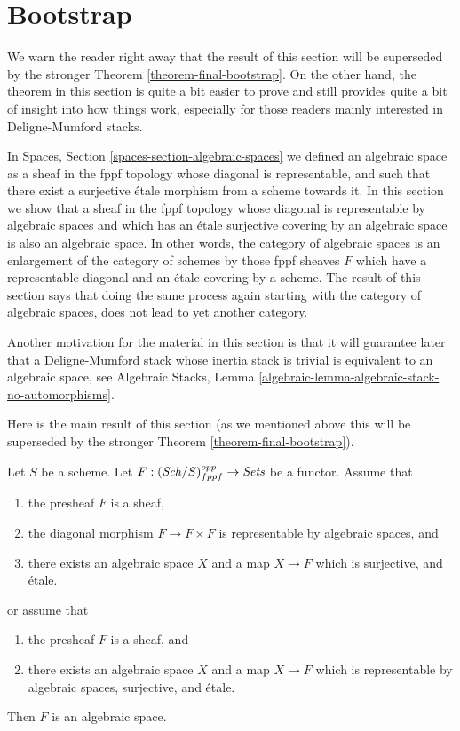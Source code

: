 \section{Bootstrap}
\label{section-bootstrap}

\noindent
We warn the reader right away that the result of this section will
be superseded by the stronger
Theorem \ref{theorem-final-bootstrap}.
On the other hand, the theorem in this section is quite a bit easier to
prove and still provides quite a bit of insight into how things work,
especially for those readers mainly interested in Deligne-Mumford
stacks.

\medskip\noindent
In
Spaces, Section \ref{spaces-section-algebraic-spaces}
we defined an algebraic space as a sheaf in the fppf topology whose
diagonal is representable, and such that there exist a surjective \'etale
morphism from a scheme towards it. In this section we show that
a sheaf in the fppf topology whose diagonal is representable by algebraic
spaces and which has an \'etale surjective covering by an algebraic space
is also an algebraic space.
In other words, the category of algebraic spaces is an enlargement of the
category of schemes by those fppf sheaves $F$ which have a representable
diagonal and an \'etale covering by a scheme. The
result of this section says that doing the same process again starting with
the category of algebraic spaces, does not lead to yet another category.

\medskip\noindent
Another motivation for the material in this section is that it will guarantee
later that a Deligne-Mumford stack whose inertia stack is trivial is equivalent
to an algebraic space, see
Algebraic Stacks, Lemma \ref{algebraic-lemma-algebraic-stack-no-automorphisms}.

\medskip\noindent
Here is the main result of this section (as we mentioned above this
will be superseded by the stronger
Theorem \ref{theorem-final-bootstrap}).

\begin{theorem}
\label{theorem-bootstrap}
Let $S$ be a scheme.
Let $F : (\mathit{Sch}/S)_{fppf}^{opp} \to \textit{Sets}$ be a functor.
Assume that
\begin{enumerate}
\item the presheaf $F$ is a sheaf,
\item the diagonal morphism $F  \to F \times F$ is representable by
algebraic spaces, and
\item there exists an algebraic space $X$
and a map $X \to F$ which is surjective, and \'etale.
\end{enumerate}
or assume that
\begin{enumerate}
\item[(a)] the presheaf $F$ is a sheaf, and
\item[(b)] there exists an algebraic space $X$ and a map $X \to F$
which is representable by algebraic spaces, surjective, and \'etale.
\end{enumerate}
Then $F$ is an algebraic space.
\end{theorem}

